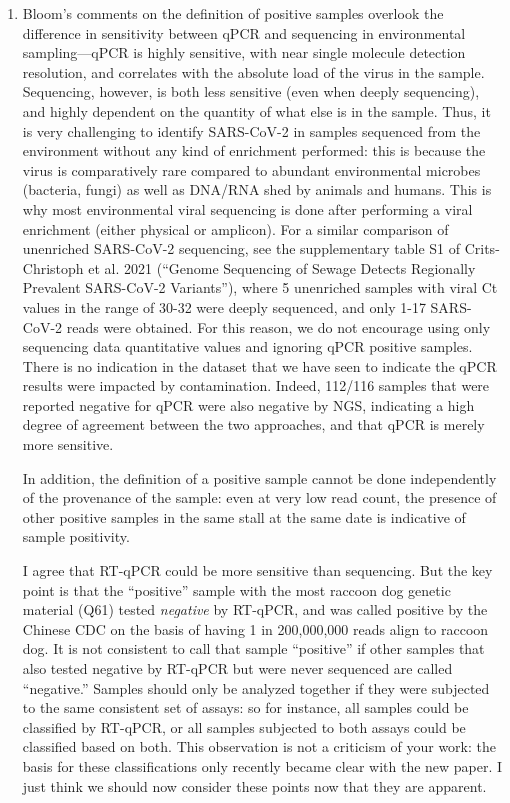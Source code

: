 \documentclass[9pt,twocolumn,twoside]{gsajnl_modified}
\begin{document}
\begin{enumerate}
\item Bloom’s comments on the definition of positive samples overlook the difference in sensitivity between qPCR and sequencing in environmental sampling---qPCR is highly sensitive, with near single molecule detection resolution, and correlates with the absolute load of the virus in the sample. Sequencing, however, is both less sensitive (even when deeply sequencing), and highly dependent on the quantity of what else is in the sample. Thus, it is very challenging to identify SARS-CoV-2 in samples sequenced from the environment without any kind of enrichment performed: this is because the virus is comparatively rare compared to abundant environmental microbes (bacteria, fungi) as well as DNA/RNA shed by animals and humans. This is why most environmental viral sequencing is done after performing a viral enrichment (either physical or amplicon). For a similar comparison of unenriched SARS-CoV-2 sequencing, see the supplementary table S1 of Crits-Christoph et al. 2021 (“Genome Sequencing of Sewage Detects Regionally Prevalent SARS-CoV-2 Variants”), where 5 unenriched samples with viral Ct values in the range of 30-32 were deeply sequenced, and only 1-17 SARS-CoV-2 reads were obtained. For this reason, we do not encourage using only sequencing data quantitative values and ignoring qPCR positive samples. There is no indication in the \citet{liu2023surveillance} dataset that we have seen to indicate the qPCR results were impacted by contamination. Indeed, 112/116 samples that were reported negative for qPCR were also negative by NGS, indicating a high degree of agreement between the two approaches, and that qPCR is merely more sensitive.

In addition, the definition of a positive sample cannot be done independently of the provenance of the sample: even at very low read count, the presence of other positive samples in the same stall at the same date is indicative of sample positivity.

{\color{black}
I agree that RT-qPCR could be more sensitive than sequencing.
But the key point is that the ``positive'' sample with the most raccoon dog genetic material (Q61) tested \emph{negative} by RT-qPCR, and was called positive by the Chinese CDC on the basis of having 1 in 200,000,000 reads align to raccoon dog.
It is not consistent to call that sample ``positive'' if other samples that also tested negative by RT-qPCR but were never sequenced are called ``negative.''
Samples should only be analyzed together if they were subjected to the same consistent set of assays: so for instance, all samples could be classified by RT-qPCR, or all samples subjected to both assays could be classified based on both.
This observation is not a criticism of your work: the basis for these classifications only recently became clear with the new \citet{liu2023surveillance} paper.
I just think we should now consider these points now that they are apparent.

}
\end{enumerate}
\end{document}
